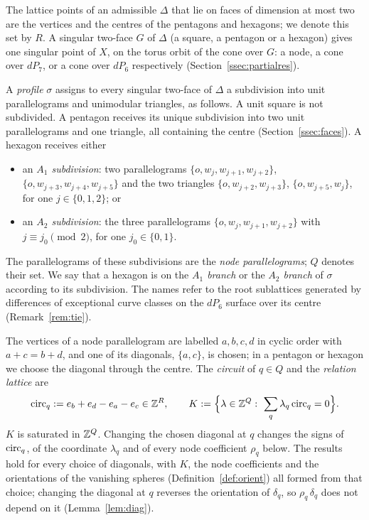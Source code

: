 The lattice points of an admissible $\Delta$ that lie on faces of dimension at most two are the vertices and the
centres of the pentagons and hexagons; we denote this set by $R$. A singular two-face $G$ of $\Delta$ (a square, a
pentagon or a hexagon) gives one singular point of $X$, on the torus orbit of the cone over $G$: a node, a cone over
$dP_7$, or a cone over $dP_6$ respectively (Section~\ref{ssec:partialres}).

\begin{definition}\label{def:profile}
A \emph{profile} $\sigma$ assigns to every singular two-face of $\Delta$ a subdivision into unit parallelograms and
unimodular triangles, as follows. A unit square is not subdivided. A pentagon receives its unique subdivision into two
unit parallelograms and one triangle, all containing the centre (Section~\ref{ssec:faces}). A hexagon receives either
\begin{itemize}
\item an \emph{$A_1$ subdivision}: two parallelograms $\{o,w_j,w_{j+1},w_{j+2}\}$, $\{o,w_{j+3},w_{j+4},w_{j+5}\}$ and the
two triangles $\{o,w_{j+2},w_{j+3}\}$, $\{o,w_{j+5},w_j\}$, for one $j\in\{0,1,2\}$; or
\item an \emph{$A_2$ subdivision}: the three parallelograms $\{o,w_j,w_{j+1},w_{j+2}\}$ with $j\equiv j_0\pmod 2$, for one
$j_0\in\{0,1\}$.
\end{itemize}
The parallelograms of these subdivisions are the \emph{node parallelograms}; $Q$ denotes their set.
We say that a hexagon is on the \emph{$A_1$ branch} or the \emph{$A_2$ branch} of $\sigma$ according to its
subdivision. The names refer to the root sublattices generated by differences of exceptional curve classes
on the $dP_6$ surface over its centre (Remark~\ref{rem:tie}).
\end{definition}

The vertices of a node parallelogram are labelled $a,b,c,d$ in cyclic order with $a+c=b+d$, and one of its diagonals,
$\{a,c\}$, is chosen; in a pentagon or hexagon we choose the diagonal through the centre. The \emph{circuit} of $q\in Q$
and the \emph{relation lattice} are
\[
\mathrm{circ}_q:=e_b+e_d-e_a-e_c\in\mathbb Z^R,\qquad K:=\Bigl\{\lambda\in\mathbb Z^Q:\ \sum_q\lambda_q\,\mathrm{circ}_q=0\Bigr\}.
\]
$K$ is saturated in $\mathbb Z^Q$. Changing the chosen diagonal at $q$ changes the signs of $\mathrm{circ}_q$, of the coordinate
$\lambda_q$ and of every node coefficient $\rho_q$ below. The results hold for every choice of diagonals, with $K$, the node
coefficients and the orientations of the vanishing spheres (Definition~\ref{def:orient}) all formed from that choice;
changing the diagonal at $q$ reverses the orientation of $\delta_q$, so $\rho_q\,\delta_q$ does not depend on it
(Lemma~\ref{lem:diag}).

